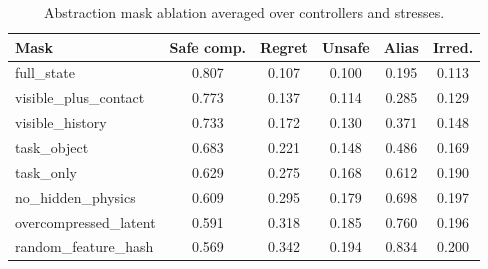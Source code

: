 \begin{table}[t]
\centering
\caption{Abstraction mask ablation averaged over controllers and stresses.}
\label{tab:mask-ablation}
\small
\begin{tabular}{lccccc}
\toprule
Mask & Safe comp. & Regret & Unsafe & Alias & Irred. \\
\midrule
full\_state & 0.807 & 0.107 & 0.100 & 0.195 & 0.113 \\
visible\_plus\_contact & 0.773 & 0.137 & 0.114 & 0.285 & 0.129 \\
visible\_history & 0.733 & 0.172 & 0.130 & 0.371 & 0.148 \\
task\_object & 0.683 & 0.221 & 0.148 & 0.486 & 0.169 \\
task\_only & 0.629 & 0.275 & 0.168 & 0.612 & 0.190 \\
no\_hidden\_physics & 0.609 & 0.295 & 0.179 & 0.698 & 0.197 \\
overcompressed\_latent & 0.591 & 0.318 & 0.185 & 0.760 & 0.196 \\
random\_feature\_hash & 0.569 & 0.342 & 0.194 & 0.834 & 0.200 \\
\bottomrule
\end{tabular}
\end{table}
